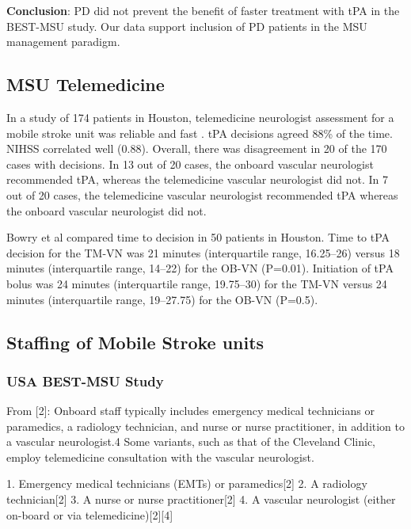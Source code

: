 \textbf{Conclusion}: PD did not prevent the benefit of faster treatment with tPA in the BEST-MSU study. Our data support inclusion of PD patients in the MSU management paradigm.

\subsection{MSU Telemedicine}

In a study of 174 patients in Houston, telemedicine neurologist assessment for a mobile stroke unit was reliable and fast \cite{wu_telemedicine_2017} . tPA decisions agreed 88\% of the time. NIHSS correlated well (0.88). Overall, there was disagreement in 20 of the 170 cases with decisions. In 13 out of 20 cases, the onboard vascular neurologist recommended tPA, whereas the telemedicine vascular neurologist did not. In 7 out of 20 cases, the telemedicine vascular neurologist recommended tPA whereas the onboard vascular neurologist did not. 

Bowry et al \cite{bowry_time_2018} compared time to decision in 50 patients in Houston. Time to tPA decision for the TM-VN was 21 minutes (interquartile range, 16.25–26) versus 18 minutes (interquartile range, 14–22) for the OB-VN (P=0.01). Initiation of tPA bolus was 24 minutes (interquartile range, 19.75–30) for the TM-VN versus 24 minutes (interquartile range, 19–27.75) for the OB-VN (P=0.5).

\subsection{Staffing of Mobile Stroke units}

\subsubsection{USA BEST-MSU Study}

From [2]: Onboard staff typically includes emergency medical technicians or paramedics, a radiology technician, and nurse or nurse practitioner, in addition to a vascular neurologist.4 Some variants, such as that of the Cleveland Clinic, employ telemedicine consultation with the vascular neurologist. 

1. Emergency medical technicians (EMTs) or paramedics[2]
2. A radiology technician[2]
3. A nurse or nurse practitioner[2]
4. A vascular neurologist (either on-board or via telemedicine)[2][4]

